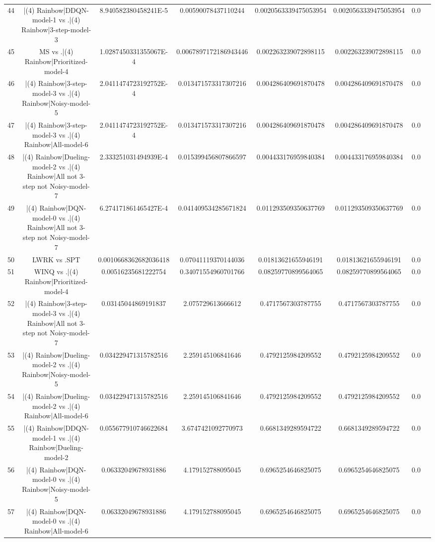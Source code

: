 \documentclass[a3paper,10pt]{article}
\begin{document}
\begin{table}[!htp]
\begin{tabular}{cccccccc}
44&|(4) Rainbow|DDQN-model-1 vs .|(4) Rainbow|3-step-model-3&8.940582380458241E-5&0.00590078437110244&0.0020563339475053954&0.0020563339475053954&0.0\\
45&MS vs .|(4) Rainbow|Prioritized-model-4&1.0287450331355067E-4&0.0067897172186943446&0.002263239072898115&0.002263239072898115&0.0\\
46&|(4) Rainbow|3-step-model-3 vs .|(4) Rainbow|Noisy-model-5&2.0411474723192752E-4&0.013471573317307216&0.004286409691870478&0.004286409691870478&0.0\\
47&|(4) Rainbow|3-step-model-3 vs .|(4) Rainbow|All-model-6&2.0411474723192752E-4&0.013471573317307216&0.004286409691870478&0.004286409691870478&0.0\\
48&|(4) Rainbow|Dueling-model-2 vs .|(4) Rainbow|All not 3-step not Noisy-model-7&2.333251031494939E-4&0.015399456807866597&0.004433176959840384&0.004433176959840384&0.0\\
49&|(4) Rainbow|DQN-model-0 vs .|(4) Rainbow|All not 3-step not Noisy-model-7&6.274171861465427E-4&0.041409534285671824&0.011293509350637769&0.011293509350637769&0.0\\
50&LWRK vs .SPT&0.0010668362682036418&0.07041119370144036&0.01813621655946191&0.01813621655946191&0.0\\
51&WINQ vs .|(4) Rainbow|Prioritized-model-4&0.00516235681222754&0.34071554960701766&0.08259770899564065&0.08259770899564065&0.0\\
52&|(4) Rainbow|3-step-model-3 vs .|(4) Rainbow|All not 3-step not Noisy-model-7&0.03145044869191837&2.075729613666612&0.4717567303787755&0.4717567303787755&0.0\\
53&|(4) Rainbow|Dueling-model-2 vs .|(4) Rainbow|Noisy-model-5&0.034229471315782516&2.259145106841646&0.4792125984209552&0.4792125984209552&0.0\\
54&|(4) Rainbow|Dueling-model-2 vs .|(4) Rainbow|All-model-6&0.034229471315782516&2.259145106841646&0.4792125984209552&0.4792125984209552&0.0\\
55&|(4) Rainbow|DDQN-model-1 vs .|(4) Rainbow|Dueling-model-2&0.055677910746622684&3.6747421092770973&0.6681349289594722&0.6681349289594722&0.0\\
56&|(4) Rainbow|DQN-model-0 vs .|(4) Rainbow|Noisy-model-5&0.06332049678931886&4.179152788095045&0.6965254646825075&0.6965254646825075&0.0\\
57&|(4) Rainbow|DQN-model-0 vs .|(4) Rainbow|All-model-6&0.06332049678931886&4.179152788095045&0.6965254646825075&0.6965254646825075&0.0\\

\end{tabular}
\end{table}
\end{document}
